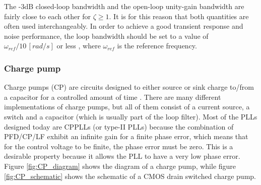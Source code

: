 \noindent The -3dB closed-loop bandwidth and the open-loop unity-gain bandwidth are fairly close to each other for $\zeta \geq 1$. It is 
for this reason that both quantities are often used interchangeably. In order to achieve a good transient response and noise performance,
the loop bandwidth should be set to a value of $\omega_{ref}/10 \, [rad/s]$ or less \cite{Razavi_PLL_book}, where $\omega_{ref}$ is the reference frequency.
\subsubsection{Charge pump}
Charge pumps (CP) are circuits designed to either source or sink charge to/from a capacitor for a controlled amount of time \cite{Palumbo2010}. There are
many different implementations of charge pumps, but all of them consist of a current source, a switch and a capacitor (which is usually 
part of the loop filter). Most of the PLLs designed today are CPPLLs (or type-II PLLs) because the combination of PFD/CP/LF exhibit an 
infinite gain for a finite phase error, which means that for the control voltage to be finite, the phase error must be zero. This is a 
desirable property because it allows the PLL to have a very low phase error. Figure \ref{fig:CP_diagram} shows the diagram of a
charge pump, while figure \ref{fig:CP_schematic} shows the schematic of a CMOS drain switched charge pump.
